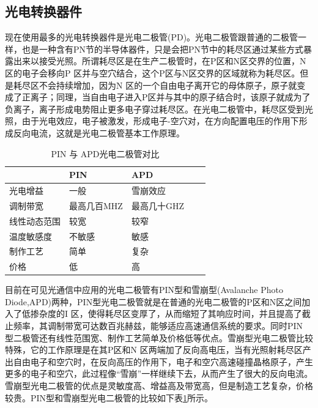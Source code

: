 \subsection{光电转换器件}
现在使用最多的光电转换器件是光电二极管(PD)。光电二极管跟普通的二极管一样，也是一种含有PN节的半导体器件，只是会把PN节中的耗尽区通过某些方式暴露出来以接受光照。所谓耗尽区是在生产二极管时，在P区和N区交界的位置，N 区的电子会移向P 区并与空穴结合，这个P区与N区交界的区域就称为耗尽区。但是耗尽区不会持续增加，因为N 区的一个自由电子离开它的母体原子，原子就变成了正离子；同理，当自由电子进入P区并与其中的原子结合时，该原子就成为了负离子，离子形成电势阻止更多电子穿过耗尽区。在光电二极管中，耗尽区受到光照，由于光电效应，电子被激发，形成电子-空穴对，在方向配置电压的作用下形成反向电流，这就是光电二极管基本工作原理。
\begin{table}[htbp]
    \caption{PIN 与 APD光电二极管对比}
    \label{tab:PIN_APD_Comparsion}
    \centering
    \begin{tabular}{lllll}
        \toprule
         & PIN & APD \\
        \midrule
        光电增益       & 一般   &雪崩效应    \\
        调制带宽       & 最高几百MHZ  &最高几十GHZ    \\
        线性动态范围   & 较宽  &较窄    \\
        温度敏感度    & 不敏感  &敏感    \\
        制作工艺    &简单 &复杂    \\
        价格    & 低  &高    \\
        \bottomrule
    \end{tabular}
\end{table}

目前在可见光通信中应用的光电二极管有PIN型和雪崩型(Avalanche Photo Diode,APD)两种，PIN型光电二极管就是在普通的光电二极管的P区和N区之间加入了低掺杂度的I 区，使得耗尽区变厚了，从而缩短了其响应时间，并且提高了截止频率，其调制带宽可达数百兆赫兹，能够适应高速通信系统的要求。同时PIN 型二极管还有线性范围宽、制作工艺简单及价格低等优点。雪崩型光电二极管比较特殊，它的工作原理是在其P区和N 区两端加了反向高电压，当有光照射耗尽区产出自由电子和空穴时，在反向高压的作用下，电子和空穴高速碰撞晶格原子，产生更多的电子和空穴，此过程像“雪崩”一样继续下去，从而产生了很大的反向电流。雪崩型光电二极管的优点是灵敏度高、增益高及带宽高，但是制造工艺复杂，价格较贵。PIN型和雪崩型光电二极管的比较如下表\ref{tab:PIN_APD_Comparsion}所示。


